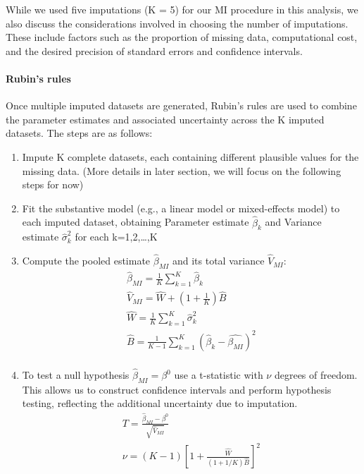 \documentclass{article}
\begin{document}
While we used five imputations (K = 5) for our MI procedure in this
analysis, we also discuss the considerations involved in choosing the
number of imputations. These include factors such as the proportion of
missing data, computational cost, and the desired precision of standard
errors and confidence intervals.

\paragraph{Rubin's rules}\label{rubins-rules}

Once multiple imputed datasets are generated, Rubin's rules are used to
combine the parameter estimates and associated uncertainty across the K
imputed datasets. The steps are as follows:

\begin{enumerate}
\def\labelenumi{\arabic{enumi}.}
\item
  Impute K complete datasets, each containing different plausible values
  for the missing data. (More details in later section, we will focus on
  the following steps for now)
\item
  Fit the substantive model (e.g., a linear model or mixed-effects
  model) to each imputed dataset, obtaining Parameter estimate
  \(\hat{\beta}_{k}\) and Variance estimate \(\hat{\sigma}_{k}^{2}\) for
  each k=1,2,\ldots,K
\item
  Compute the pooled estimate \(\hat{\beta}_{MI}\) and its total
  variance \(\hat{V}_{MI}\): \begin{align*}
    \hat{\beta}_{MI} = \frac{1}{K} \sum_{k=1}^{K}{\hat{\beta}_{k}} \\
    \hat{V}_{MI} = \hat{W} + (1 + \frac{1}{K}) \hat{B} \\
    \hat{W} = \frac{1}{K} \sum^{K}_{k=1}{\hat{\sigma}^{2}_{k}} \\
    \hat{B} = \frac{1}{K-1} \sum^{K}_{k=1}({\hat{\beta}_{k}} - \hat{\beta_{MI}})^{2} \\
    \end{align*}
\item
  To test a null hypothesis \(\hat{\beta}_{MI} = \beta^{0}\) use a
  t-statistic with \(\nu\) degrees of freedom. This allows us to
  construct confidence intervals and perform hypothesis testing,
  reflecting the additional uncertainty due to imputation.
  \begin{align*}
    T = \frac{\hat{\beta}_{MI} - \beta^{0}}  {\sqrt{\hat{V}_{MI}}} \\
    \nu = (K-1)[1 + \frac{\hat{W}}{(1 + 1/K) \hat{B}}]^{2}
    \end{align*}
\end{enumerate}
\end{document}

